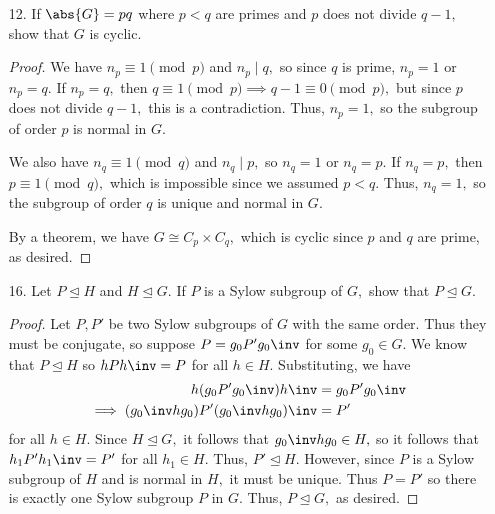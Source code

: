 \documentclass{article}
\begin{document}
\begin{itemize}
\begin{enumerate}[(a)]
\begin{proof}
				\end{proof}

			\item $\abs{G}=455$
				\begin{proof}
					Since $455=5\cdot 91,$ a subgroup of index 5 has order 91. Similarly to the previous part, we have $n_{91}\equiv 1\pmod{91}$ so $n_{91}=1,$ so it is unique and normal. Then the subgroup of order 91 has $n_7=n_{13}=1$ subgroup of order 7 and 13, respectively, so these subgroups are normal. By a theorem, this subgroup is isomorphic to $C_7\times C_{13},$ which is cyclic, as desired.
					
				\end{proof}
				
		\end{enumerate}

	\item[12.] If $\abs{G}=pq$ where $p<q$ are primes and $p$ does not divide $q-1,$ show that $G$ is cyclic.
		\begin{proof}
			We have $n_p\equiv 1\pmod p$ and $n_p\mid q,$ so since $q$ is prime, $n_p=1$ or $n_p=q.$ If $n_p=q,$ then $q\equiv1\pmod p\implies q-1\equiv0\pmod p,$ but since $p$ does not divide $q-1,$ this is a contradiction. Thus, $n_p=1,$ so the subgroup of order $p$ is normal in $G.$ 

			We also have $n_q\equiv1\pmod q$ and $n_q\mid p,$ so $n_q=1$ or $n_q=p.$ If $n_q=p,$ then $p\equiv 1\pmod q,$ which is impossible since we assumed $p<q.$ Thus, $n_q=1,$ so the subgroup of order $q$ is unique and normal in $G.$

			By a theorem, we have $G\cong C_p\times C_q,$ which is cyclic since $p$ and $q$ are prime, as desired.
			
		\end{proof}

	\item[16.] Let $P\unlhd H$ and $H\unlhd G.$ If $P$ is a Sylow subgroup of $G,$ show that $P\unlhd G.$
		\begin{proof}
			Let $P, P'$ be two Sylow subgroups of $G$ with the same order. Thus they must be conjugate, so suppose $P=g_0P'g_0\inv$ for some $g_0\in G.$ We know that $P\unlhd H$ so $hPh\inv=P$ for all $h\in H.$ Substituting, we have 
			\begin{align*}
				h(g_0P'g_0\inv)h\inv &= g_0P'g_0\inv \\
				\implies (g_0\inv hg_0) P' (g_0\inv hg_0)\inv &= P'
			\end{align*}
			for all $h\in H.$ Since $H\unlhd G,$ it follows that $g_0\inv hg_0\in H,$ so it follows that $h_1 P' h_1\inv = P'$ for all $h_1\in H.$ Thus, $P'\unlhd H.$ However, since $P$ is a Sylow subgroup of $H$ and is normal in $H,$ it must be unique. Thus $P=P'$ so there is exactly one Sylow subgroup $P$ in $G.$ Thus, $P\unlhd G,$ as desired.
			
		\end{proof}
		
\end{itemize}
\end{document}
